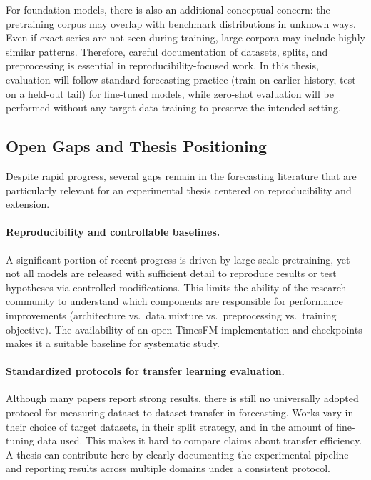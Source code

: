 For foundation models, there is also an additional conceptual concern: the pretraining corpus may overlap with benchmark distributions in unknown ways. Even if exact series are not seen during training, large corpora may include highly similar patterns. Therefore, careful documentation of datasets, splits, and preprocessing is essential in reproducibility-focused work. In this thesis, evaluation will follow standard forecasting practice (train on earlier history, test on a held-out tail) for fine-tuned models, while zero-shot evaluation will be performed without any target-data training to preserve the intended setting.

\subsection{Open Gaps and Thesis Positioning}

Despite rapid progress, several gaps remain in the forecasting literature that are particularly relevant for an experimental thesis centered on reproducibility and extension.

\paragraph{Reproducibility and controllable baselines.}
A significant portion of recent progress is driven by large-scale pretraining, yet not all models are released with sufficient detail to reproduce results or test hypotheses via controlled modifications. This limits the ability of the research community to understand which components are responsible for performance improvements (architecture vs.\ data mixture vs.\ preprocessing vs.\ training objective). The availability of an open TimesFM implementation and checkpoints makes it a suitable baseline for systematic study.

\paragraph{Standardized protocols for transfer learning evaluation.}
Although many papers report strong results, there is still no universally adopted protocol for measuring dataset-to-dataset transfer in forecasting. Works vary in their choice of target datasets, in their split strategy, and in the amount of fine-tuning data used. This makes it hard to compare claims about transfer efficiency. A thesis can contribute here by clearly documenting the experimental pipeline and reporting results across multiple domains under a consistent protocol.

